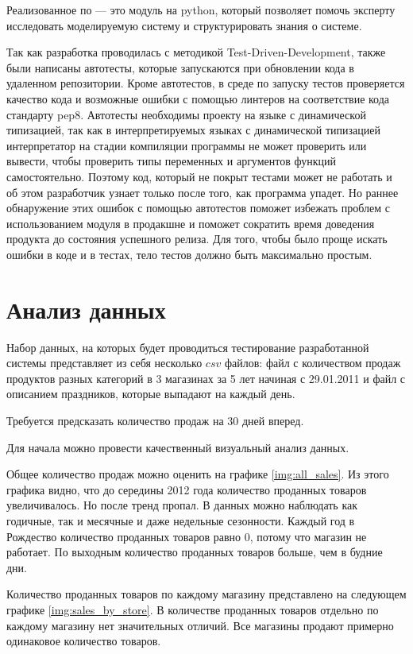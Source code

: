 Реализованное по --- это модуль на python, который позволяет помочь эксперту
исследовать моделируемую систему и структурировать знания о системе.

Так как разработка проводилась с методикой Test-Driven-Development,
также были написаны автотесты, которые запускаются
при обновлении кода в удаленном репозитории. Кроме автотестов,
в среде по запуску тестов проверяется качество кода и возможные ошибки
с помощью линтеров на соответствие кода стандарту pep8.
Автотесты необходимы проекту на языке с динамической типизацией,
так как в интерпретируемых языках с динамической типизацией
интерпретатор на стадии компиляции программы не может проверить или вывести, чтобы проверить
типы переменных и аргументов функций самостоятельно. Поэтому код, который
не покрыт тестами может не работать и об этом разработчик узнает
только после того, как программа упадет. Но раннее обнаружение этих
ошибок с помощью автотестов поможет избежать проблем с использованием модуля в
продакшне и поможет сократить время доведения продукта до состояния успешного релиза.
Для того, чтобы было проще искать ошибки в коде и в тестах,
тело тестов должно быть максимально простым.

\section{Анализ данных}

Набор данных, на которых будет проводиться тестирование разработанной системы
представляет из себя несколько $ csv $ файлов: файл с количеством продаж
продуктов разных категорий в 3 магазинах за 5 лет начиная с 29.01.2011
и файл с описанием праздников, которые выпадают на каждый день.

Требуется предсказать количество продаж на 30 дней вперед.

Для начала можно провести качественный визуальный анализ данных.

Общее количество продаж можно оценить на графике \ref{img:all_sales}.
Из этого графика видно, что до середины 2012 года количество проданных
товаров увеличивалось. Но после тренд пропал. В данных можно наблюдать
как годичные, так и месячные и даже недельные сезонности. Каждый год
в Рождество количество проданных товаров равно 0, потому что магазин не работает.
По выходным количество проданных товаров больше, чем в будние дни.

Количество проданных товаров по каждому магазину представлено на следующем графике \ref{img:sales_by_store}.
В количестве проданных товаров отдельно по каждому магазину нет значительных отличий.
Все магазины продают примерно одинаковое количество товаров.

